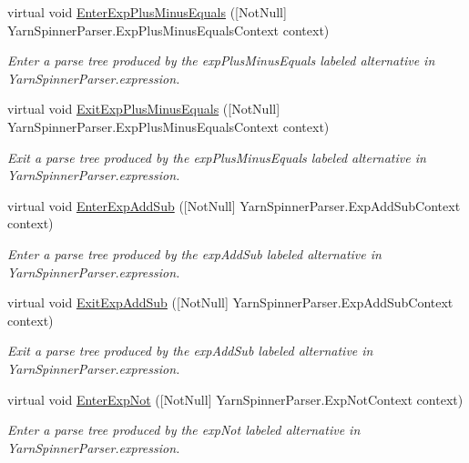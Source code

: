 \begin{DoxyCompactItemize}
virtual void \hyperlink{a00196_a905bac017e14a6d3aeea293831e3387d}{Enter\-Exp\-Plus\-Minus\-Equals} (\mbox{[}Not\-Null\mbox{]} Yarn\-Spinner\-Parser.\-Exp\-Plus\-Minus\-Equals\-Context context)
\begin{DoxyCompactList}\small\item\em Enter a parse tree produced by the {\ttfamily exp\-Plus\-Minus\-Equals} labeled alternative in Yarn\-Spinner\-Parser.\-expression. \end{DoxyCompactList}\item 
virtual void \hyperlink{a00196_a6fc472ff3937457adf2c286c37a61b7a}{Exit\-Exp\-Plus\-Minus\-Equals} (\mbox{[}Not\-Null\mbox{]} Yarn\-Spinner\-Parser.\-Exp\-Plus\-Minus\-Equals\-Context context)
\begin{DoxyCompactList}\small\item\em Exit a parse tree produced by the {\ttfamily exp\-Plus\-Minus\-Equals} labeled alternative in Yarn\-Spinner\-Parser.\-expression. \end{DoxyCompactList}\item 
virtual void \hyperlink{a00196_a63f01bf3112c5c181e607aa954dfbf7a}{Enter\-Exp\-Add\-Sub} (\mbox{[}Not\-Null\mbox{]} Yarn\-Spinner\-Parser.\-Exp\-Add\-Sub\-Context context)
\begin{DoxyCompactList}\small\item\em Enter a parse tree produced by the {\ttfamily exp\-Add\-Sub} labeled alternative in Yarn\-Spinner\-Parser.\-expression. \end{DoxyCompactList}\item 
virtual void \hyperlink{a00196_afb75f12ecf35ef5e3886ada6e5519c28}{Exit\-Exp\-Add\-Sub} (\mbox{[}Not\-Null\mbox{]} Yarn\-Spinner\-Parser.\-Exp\-Add\-Sub\-Context context)
\begin{DoxyCompactList}\small\item\em Exit a parse tree produced by the {\ttfamily exp\-Add\-Sub} labeled alternative in Yarn\-Spinner\-Parser.\-expression. \end{DoxyCompactList}\item 
virtual void \hyperlink{a00196_ad89ca0922b0ff190fc532a9ae98d49d3}{Enter\-Exp\-Not} (\mbox{[}Not\-Null\mbox{]} Yarn\-Spinner\-Parser.\-Exp\-Not\-Context context)
\begin{DoxyCompactList}\small\item\em Enter a parse tree produced by the {\ttfamily exp\-Not} labeled alternative in Yarn\-Spinner\-Parser.\-expression. \end{DoxyCompactList}\item 

\end{DoxyCompactItemize}
